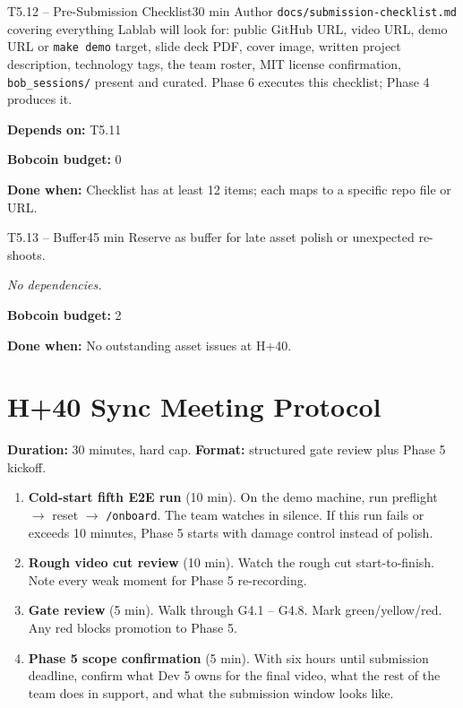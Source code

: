 \documentclass[11pt,letterpaper]{article}
\newcommand{\acceptance}[1]{\par\smallskip\textcolor{ibmgreen}{\textbf{Done when:}} #1}
\newcommand{\depends}[1]{\par\smallskip\textcolor{ibmorange}{\textbf{Depends on:}} #1}
\newcommand{\nodep}{\par\smallskip\textcolor{ibmgray}{\textit{No dependencies.}}}
\newcommand{\bobcost}[1]{\par\smallskip\textcolor{ibmaccent}{\textbf{Bobcoin budget:}} #1}
\begin{document}
\begin{task}{T5.12 -- Pre-Submission Checklist}{30 min}
Author \texttt{docs/submission-checklist.md} covering everything Lablab will look for: public GitHub URL, video URL, demo URL or \texttt{make demo} target, slide deck PDF, cover image, written project description, technology tags, the team roster, MIT license confirmation, \texttt{bob\_sessions/} present and curated. Phase 6 executes this checklist; Phase 4 produces it.
\depends{T5.11}
\bobcost{0}
\acceptance{Checklist has at least 12 items; each maps to a specific repo file or URL.}
\end{task}

\begin{task}{T5.13 -- Buffer}{45 min}
Reserve as buffer for late asset polish or unexpected re-shoots.
\nodep
\bobcost{2}
\acceptance{No outstanding asset issues at H+40.}
\end{task}

\section{H+40 Sync Meeting Protocol}

\textbf{Duration:} 30 minutes, hard cap. \textbf{Format:} structured gate review plus Phase 5 kickoff.

\begin{enumerate}
  \item \textbf{Cold-start fifth E2E run} (10 min). On the demo machine, run preflight $\rightarrow$ reset $\rightarrow$ \texttt{/onboard}. The team watches in silence. If this run fails or exceeds 10 minutes, Phase 5 starts with damage control instead of polish.
  \item \textbf{Rough video cut review} (10 min). Watch the rough cut start-to-finish. Note every weak moment for Phase 5 re-recording.
  \item \textbf{Gate review} (5 min). Walk through G4.1 -- G4.8. Mark green/yellow/red. Any red blocks promotion to Phase 5.
  \item \textbf{Phase 5 scope confirmation} (5 min). With six hours until submission deadline, confirm what Dev 5 owns for the final video, what the rest of the team does in support, and what the submission window looks like.
\end{enumerate}

\end{document}
